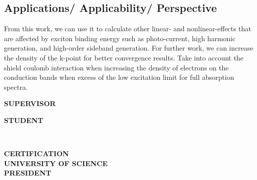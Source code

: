 \documentclass[12pt,english,a4paper]{article}
\begin{document}
\subsection*{Applications/ Applicability/ Perspective}
\quad From this work, we can use it to calculate other linear- and nonlinear-effects that are affected by exciton binding energy such as photo-current, high harmonic generation, and high-order sideband generation. For further work, we can increase the density of the k-point for better convergence results. Take into account the shield coulomb interaction when increasing the density of electrons on the conduction bands when excess of the low excitation limit for full absorption spectra.\\\null\newpage

\parbox{1.5in}{\centering \textbf{SUPERVISOR}} \hfill \parbox{1.5in}{\centering \textbf{STUDENT}}

\vspace{5\baselineskip}

\hfill\\\null\begin{center}
	
	\parbox{3.in}{\centering \textbf{CERTIFICATION\\ UNIVERSITY OF SCIENCE\\PRESIDENT}}
	\noindent 
\end{center}
	\newpage
\end{document}
